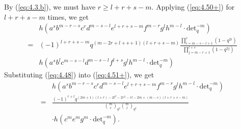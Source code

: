 \documentclass[table,a4paper,reqno]{amsart}
\numberwithin{equation}{section}
\theoremstyle{definition}
\begin{document}
By (\ref{eq:4.3.b}), we must have $r\ge l+r+s-m$. Applying (\ref{eq:4.50+}) for $l+r+s-m$ times, we get
\begin{equation}\label{eq:4.51+}
    \begin{split}
        &h\left(a^sb^{m-r-s}c^{r}d^{m-s-l}e^{l+r+s-m}f^{m-r}g^{l}h^{m-l}\cdot\text{det}_q^{-m}\right)\\
        =&(-1)^{l+r+s-m}q^{(m-2r+l+s+1)(l+r+s-m)}\frac{\prod_{i=m-s-l+1}^{r}(1-q^{2i})}{\prod_{j=m-r+1}^{l+s}(1-q^{2j})}\\
        &h\left(a^sb^{l}c^{m-s-l}d^{m-s-l}f^{l+s}g^{l}h^{m-l}\cdot\text{det}_q^{-m}\right)
    \end{split}
\end{equation}
Substituting (\ref{eq:4.48}) into (\ref{eq:4.51+}), we get
\begin{equation}\label{eq:4.57}
    \begin{split}
        &h(a^sb^{m-r-s}c^{r}d^{m-s-l}e^{l+r+s-m}f^{m-r}g^{l}h^{m-l}\cdot\text{det}_q^{-m})\\
        =&\frac{(-1)^{r+l}q^{(2m+1)(l+r)-2l^2-2r^2-rl-2m+(m-s)(l+r+s-m)}}{{m\choose r}_{q^2}{m\choose l}_{q^2}}\\
        &\cdot h\left(c^me^mg^m\cdot\text{det}_q^{-m}\right).
    \end{split}
\end{equation}
\end{document}
